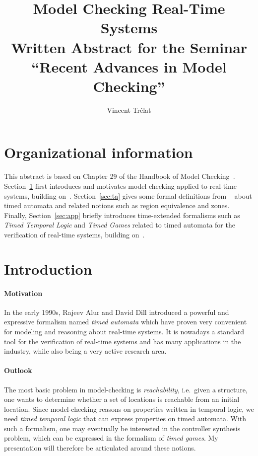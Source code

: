 \documentclass[11pt]{article}
\title{Model Checking Real-Time Systems\\\small Written Abstract for the Seminar ``Recent Advances in Model Checking''}
\author{Vincent Trélat}
\date{}
\theoremstyle{definition}
\theoremstyle{remark}
\theoremstyle{definition}
\begin{document}
\maketitle	

\section*{Organizational information}
This abstract is based on Chapter 29 of the Handbook of Model Checking~\cite{handbook}.
Section~\ref{sec:intro} first introduces and motivates model checking applied to real-time systems, building on~\cite[Chapters~29.1 and 29.2]{handbook}.
Section~\ref{sec:ta} gives some formal definitions from ~\cite[Chapters~29.2 and 29.7]{handbook} about timed automata and related notions such as region equivalence and zones.
Finally, Section~\ref{sec:app} briefly introduces time-extended formalisms such as \emph{Timed Temporal Logic} and \emph{Timed Games} related to timed automata for the verification of real-time systems, building on~\cite[Chapters~29.6~and~29.9]{handbook}.

\section{Introduction}\label{sec:intro}
\paragraph{Motivation} In the early 1990s, Rajeev Alur and David Dill introduced a powerful and expressive formalism named \emph{timed automata} which have proven very convenient for modeling and reasoning about real-time systems.
It is nowadays a standard tool for the verification of real-time systems and has many applications in the industry, while also being a very active research area.

\paragraph{Outlook} The most basic problem in model-checking is \emph{reachability}, i.e.\ given a structure, one wants to determine whether a set of locations is reachable from an initial location. Since model-checking reasons on properties written in temporal logic, we need \emph{timed temporal logic} that can express properties on timed automata. With such a formalism, one may eventually be interested in the controller synthesis problem, which can be expressed in the formalism of \emph{timed games}. My presentation will therefore be articulated around these notions.
\end{document}
